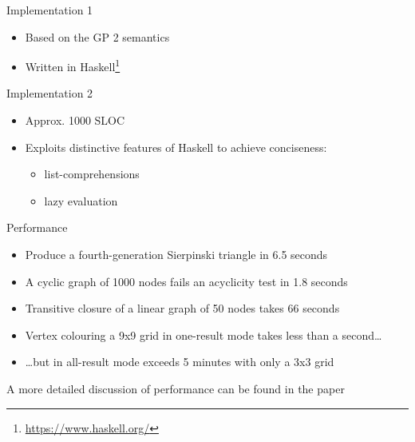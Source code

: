 \begin{frame}{Implementation 1}

\begin{itemize}
\itemsep1pt\parskip0pt
\item
  Based on the GP 2 semantics
\item
  Written in Haskell\footnote{\url{https://www.haskell.org/}}
\end{itemize}

\begin{center}
\scalebox{0.9}{  }
\end{center}

\end{frame}

\begin{frame}{Implementation 2}

\begin{center}
\small
\scalebox{0.65}{}
\end{center}

\begin{itemize}
\itemsep1pt\parskip0pt
\item
  Approx. 1000 SLOC
\item
  Exploits distinctive features of Haskell to achieve conciseness:

  \begin{itemize}
  \itemsep1pt\parskip0pt
  \item
    list-comprehensions
  \item
    lazy evaluation
  \end{itemize}
\end{itemize}

\end{frame}

\begin{frame}{Performance}

\begin{itemize}
\itemsep1pt\parskip0pt
\item
  Produce a fourth-generation Sierpinski triangle in 6.5 seconds 
\item
  A cyclic graph of 1000 nodes fails an acyclicity test in 1.8 seconds 
\item
  Transitive closure of a linear graph of 50 nodes takes 66 seconds
\item
  Vertex colouring a 9x9 grid in one-result mode takes less than a
  second\ldots{}
\item
  \ldots{}but in all-result mode exceeds 5 minutes with only a 3x3 grid 
\end{itemize}

A more detailed discussion of performance can be found in the paper

\end{frame}

